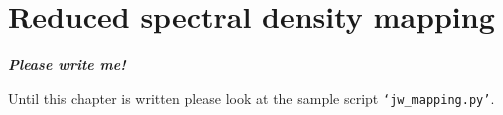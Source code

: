 
\chapter{Reduced spectral density mapping}

\textbf{\textit{Please write me!}}

Until this chapter is written please look at the sample script \texttt{`jw\_mapping.py'}.
